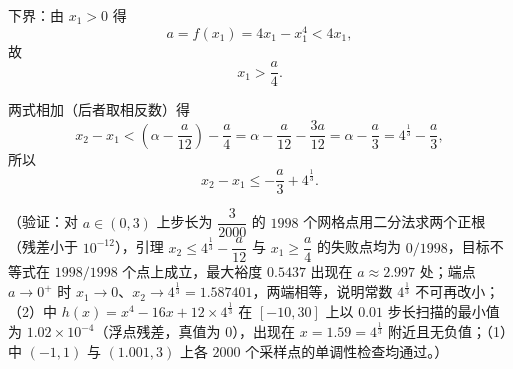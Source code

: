 \begin{answer}
下界：由 \(x_1>0\) 得
\nopagebreak[4]
\[
a=f(x_1)=4x_1-x_1^{4}<4x_1,
\]
故
\nopagebreak[4]
\[
x_1>\dfrac{a}{4}.
\]

两式相加（后者取相反数）得
\nopagebreak[4]
\[
x_2-x_1<\left(\alpha-\dfrac{a}{12}\right)-\dfrac{a}{4}=\alpha-\dfrac{a}{12}-\dfrac{3a}{12}=\alpha-\dfrac{a}{3}=4^{\frac{1}{3}}-\dfrac{a}{3},
\]
所以
\nopagebreak[4]
\[
x_2-x_1\leqslant-\dfrac{a}{3}+4^{\frac{1}{3}}.
\]

（验证：对 \(a\in(0,3)\) 上步长为 \(\dfrac{3}{2000}\) 的 \(1998\) 个网格点用二分法求两个正根（残差小于 \(10^{-12}\)），引理 \(x_2\leqslant4^{\frac{1}{3}}-\dfrac{a}{12}\) 与 \(x_1\geqslant\dfrac{a}{4}\) 的失败点均为 \(0/1998\)，目标不等式在 \(1998/1998\) 个点上成立，最大裕度 \(0.5437\) 出现在 \(a\approx2.997\) 处；端点 \(a\to0^{+}\) 时 \(x_1\to0\)、\(x_2\to4^{\frac{1}{3}}=1.587401\)，两端相等，说明常数 \(4^{\frac{1}{3}}\) 不可再改小；（2）中 \(h(x)=x^{4}-16x+12\times4^{\frac{1}{3}}\) 在 \([-10,30]\) 上以 \(0.01\) 步长扫描的最小值为 \(1.02\times10^{-4}\)（浮点残差，真值为 \(0\)），出现在 \(x=1.59=4^{\frac{1}{3}}\) 附近且无负值；（1）中 \((-1,1)\) 与 \((1.001,3)\) 上各 \(2000\) 个采样点的单调性检查均通过。）




\end{answer}